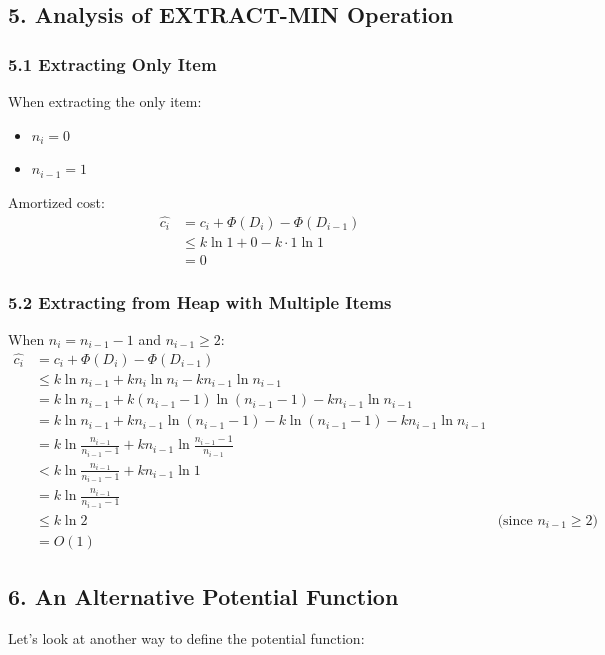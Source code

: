 \documentclass[11pt]{article}
\theoremstyle{definition}
\begin{document}
\subsection*{5. Analysis of EXTRACT-MIN Operation}

\subsubsection*{5.1 Extracting Only Item}
When extracting the only item:
\begin{itemize}
  \item $n_i = 0$
  \item $n_{i-1} = 1$
\end{itemize}

Amortized cost:
\begin{align*}
\hat{c_i} &= c_i + \Phi(D_i) - \Phi(D_{i-1}) \\
&\leq k \ln 1 + 0 - k \cdot 1 \ln 1 \\
&= 0
\end{align*}

\subsubsection*{5.2 Extracting from Heap with Multiple Items}
When $n_i = n_{i-1} - 1$ and $n_{i-1} \geq 2$:
\begin{align*}
\hat{c_i} &= c_i + \Phi(D_i) - \Phi(D_{i-1}) \\
&\leq k \ln n_{i-1} + kn_i \ln n_i - kn_{i-1} \ln n_{i-1} \\
&= k \ln n_{i-1} + k(n_{i-1} - 1)\ln(n_{i-1} - 1) - kn_{i-1} \ln n_{i-1} \\
&= k \ln n_{i-1} + kn_{i-1} \ln(n_{i-1} - 1) - k\ln(n_{i-1} - 1) - kn_{i-1} \ln n_{i-1} \\
&= k \ln \frac{n_{i-1}}{n_{i-1} - 1} + kn_{i-1} \ln \frac{n_{i-1} - 1}{n_{i-1}} \\
&< k \ln \frac{n_{i-1}}{n_{i-1} - 1} + kn_{i-1} \ln 1 \\
&= k \ln \frac{n_{i-1}}{n_{i-1} - 1} \\
&\leq k \ln 2 & \text{(since } n_{i-1} \geq 2\text{)} \\
&= O(1)
\end{align*}

\subsection*{6. An Alternative Potential Function}
Let's look at another way to define the potential function:
\end{document}

